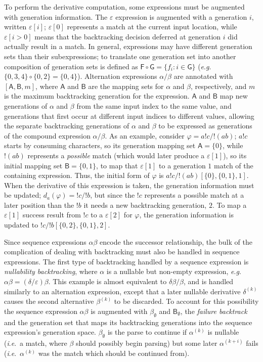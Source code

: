 \documentclass[submission,copyright,creativecommons]{eptcs}
\newcommand{\g}[1]{\mathsf{#1}}
\newcommand{\of}[2]{#1 \circ #2}
\newcommand{\ie}{\textit{i}.\textit{e}.}
\newcommand{\eg}{\textit{e}.\textit{g}.}
\begin{document}
To perform the derivative computation, some expressions must be augmented with generation information. 
The $\varepsilon$ expression is augmented with a generation $i$, written $\varepsilon[i]$; $\varepsilon[0]$ represents a match at the current input location, while $\varepsilon[i > 0]$ means that the backtracking decision deferred at generation $i$ did actually result in a match. 
In general, expressions may have different generation sets than their subexpressions; to translate one generation set into another composition of generation sets is defined as $\of{\g{F}}{\g{G}} = \{f_i : i \in \g{G}\}$ (\eg\ $\of{\{0, 3, 4\}}{\{0, 2\}} = \{0, 4\}$). 
Alternation expressions $\alpha/\beta$ are annotated with $[\g{A},\g{B},m]$, where $\g{A}$ and $\g{B}$ are the mapping sets for $\alpha$ and $\beta$, respectively, and $m$ is the maximum backtracking generation for the expression.
$\g{A}$ and $\g{B}$ map new generations of $\alpha$ and $\beta$ from the same input index to the same value, and generations that first occur at different input indices to different values, allowing the separate backtracking generations of $\alpha$ and $\beta$ to be expressed as generations of the compound expression $\alpha/\beta$.
As an example, consider $\varphi = a!c/!(ab)$; $a!c$ starts by consuming characters, so its generation mapping set $\g{A} = \{0\}$, while $!(ab)$ represents a \emph{possible} match (which would later produce a $\varepsilon[1]$), so its initial mapping set $\g{B} = \{0, 1\}$, to map that $\varepsilon[1]$ to a generation $1$ match of the containing expression. 
Thus, the initial form of $\varphi$ is $a!c/!(ab)[\{0\},\{0,1\},1]$. 
When the derivative of this expression is taken, the generation information must be updated; $d_a(\varphi) = !c/!b$, but since the $!c$ represents a possible match at a later position than the $!b$ it needs a new backtracking generation, $2$.
To map a $\varepsilon[1]$ success result from $!c$ to a $\varepsilon[2]$ for $\varphi$, the generation information is updated to $!c/!b[\{0,2\},\{0,1\},2]$.

Since sequence expressions $\alpha\beta$ encode the successor relationship, the bulk of the complication of dealing with backtracking must also be handled in sequence expressions. 
The first type of backtracking handled by a sequence expression is \emph{nullability backtracking}, where $\alpha$ is a nullable but non-empty expression, \eg\ $\alpha\beta = (\delta/\varepsilon)\beta$. 
This example is almost equivalent to $\delta\beta/\beta$, and is handled similarly to an alternation expression, except that a later nullable derivative $\delta^{(k)}$ causes the second alternative $\beta^{(k)}$ to be discarded\footnotemark. 
To account for this possibility the sequence expression $\alpha\beta$ is augmented with $\beta_\emptyset$ and $\g{B}_\emptyset$, the \emph{failure backtrack} and the generation set that maps its backtracking generations into the sequence expression's generation space. 
$\beta_\emptyset$ is the parse to continue if $\alpha^{(k)}$ is nullable (\ie\ a match, where $\beta$ should possibly begin parsing) but some later $\alpha^{(k+i)}$ fails (\ie\ $\alpha^{(k)}$ was the match which should be continued from).
\end{document}
